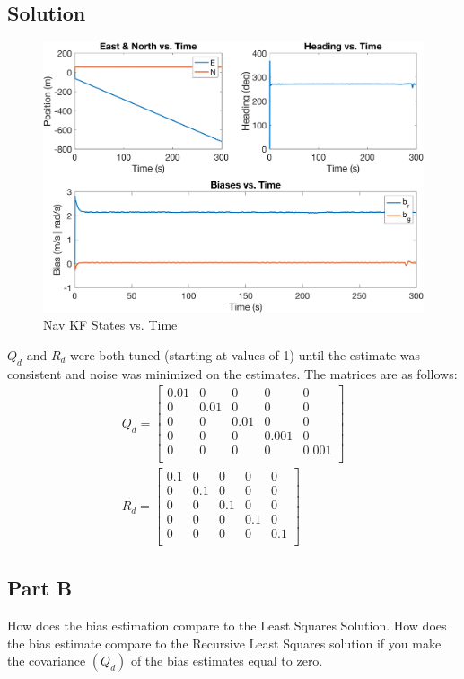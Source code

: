 \documentclass{article}
\begin{document}
\subsection*{Solution}
\begin{figure}[H]
    \centering
    \includegraphics[width=0.75\linewidth]{../figures/p3a.png}
    \caption{Nav KF States vs. Time}\label{fig:p3a}
\end{figure}
$Q_d$ and $R_d$ were both tuned (starting at values of 1) until the estimate was consistent and noise was minimized on the estimates.  The matrices are as follows:
\begin{gather*}
    Q_d = \begin{bmatrix}
        0.01 & 0 & 0 & 0 & 0\\
        0 & 0.01 & 0 & 0 & 0\\
        0 & 0 & 0.01 & 0 & 0\\
        0 & 0 & 0 & 0.001 & 0\\
        0 & 0 & 0 & 0 & 0.001\\
    \end{bmatrix}\\
    R_d = \begin{bmatrix}
        0.1 & 0 & 0 & 0 & 0\\
        0 & 0.1 & 0 & 0 & 0\\
        0 & 0 & 0.1 & 0 & 0\\
        0 & 0 & 0 & 0.1 & 0\\
        0 & 0 & 0 & 0 & 0.1\\
    \end{bmatrix}
\end{gather*}

\subsection*{Part B}
How does the bias estimation compare to the Least Squares Solution. How does the bias estimate compare to the Recursive Least Squares solution if 
you make the covariance $(Q_d)$ of the bias estimates equal to zero.
\end{document}
